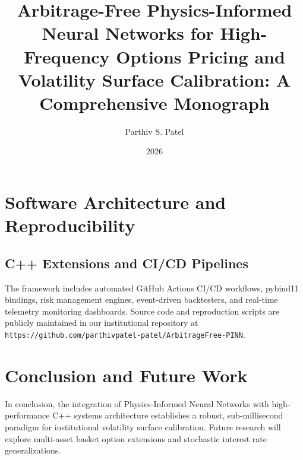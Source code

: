 \documentclass[11pt,a4paper]{report}
\title{Arbitrage-Free Physics-Informed Neural Networks for High-Frequency Options Pricing and Volatility Surface Calibration: A Comprehensive Monograph}
\author{Parthiv S. Patel}
\date{2026}
\begin{document}
\maketitle
\tableofcontents








\chapter{Software Architecture and Reproducibility}
\section{C++ Extensions and CI/CD Pipelines}
The framework includes automated GitHub Actions CI/CD workflows, pybind11 bindings, risk management engines, event-driven backtesters, and real-time telemetry monitoring dashboards. Source code and reproduction scripts are publicly maintained in our institutional repository at \texttt{https://github.com/parthivpatel-patel/ArbitrageFree-PINN}.

\chapter{Conclusion and Future Work}
In conclusion, the integration of Physics-Informed Neural Networks with high-performance C++ systems architecture establishes a robust, sub-millisecond paradigm for institutional volatility surface calibration. Future research will explore multi-asset basket option extensions and stochastic interest rate generalizations.
\end{document}
